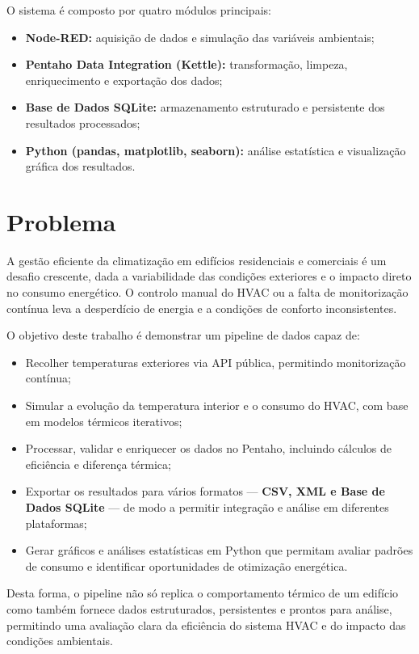 \documentclass[a4paper, 12pt]{article} %
\begin{document}
O sistema é composto por quatro módulos principais:
\begin{itemize}
	\item \textbf{Node-RED:} aquisição de dados e simulação das variáveis ambientais;
	\item \textbf{Pentaho Data Integration (Kettle):} transformação, limpeza, enriquecimento e exportação dos dados;
	\item \textbf{Base de Dados SQLite:} armazenamento estruturado e persistente dos resultados processados;
	\item \textbf{Python (pandas, matplotlib, seaborn):} análise estatística e visualização gráfica dos resultados.
\end{itemize}


\newpage
\section{Problema}
A gestão eficiente da climatização em edifícios residenciais e comerciais é um desafio crescente, dada a variabilidade das condições exteriores e o impacto direto no consumo energético.
O controlo manual do HVAC ou a falta de monitorização contínua leva a desperdício de energia e a condições de conforto inconsistentes.\

O objetivo deste trabalho é demonstrar um pipeline de dados capaz de:
\begin{itemize}
	\item Recolher temperaturas exteriores via API pública, permitindo monitorização contínua;
	\item Simular a evolução da temperatura interior e o consumo do HVAC, com base em modelos térmicos iterativos;
	\item Processar, validar e enriquecer os dados no Pentaho, incluindo cálculos de eficiência e diferença térmica;
	\item Exportar os resultados para vários formatos — \textbf{CSV, XML e Base de Dados SQLite} — de modo a permitir integração e análise em diferentes plataformas;
	\item Gerar gráficos e análises estatísticas em Python que permitam avaliar padrões de consumo e identificar oportunidades de otimização energética.
\end{itemize}

Desta forma, o pipeline não só replica o comportamento térmico de um edifício como também fornece dados estruturados, persistentes e prontos para análise, permitindo uma avaliação clara da eficiência do sistema HVAC e do impacto das condições ambientais.
\end{document}
